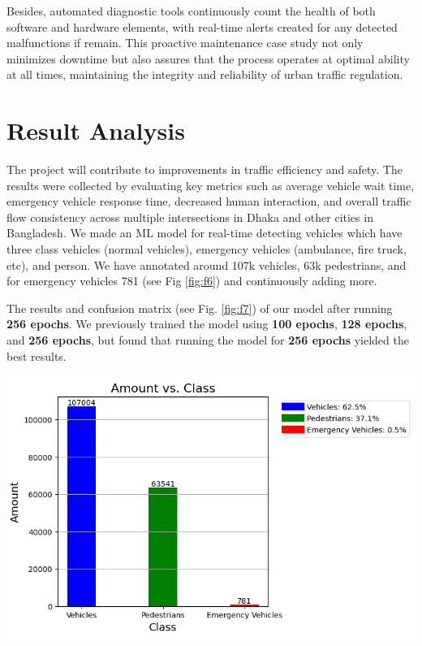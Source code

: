 \documentclass[conference]{IEEEtran}
\begin{document}
Besides, automated diagnostic tools continuously count the health of both software and hardware elements, with real-time alerts created for any detected malfunctions if remain. This proactive maintenance case study not only minimizes downtime but also assures that the process operates at optimal ability at all times, maintaining the integrity and reliability of urban traffic regulation. 


\section{Result Analysis}
The project will contribute to improvements in traffic efficiency and safety. The results were collected by evaluating key metrics such as average vehicle wait time, emergency vehicle response time, decreased human interaction, and overall traffic flow consistency across multiple intersections in Dhaka and other cities in Bangladesh. We made an ML model for real-time detecting vehicles which have three class vehicles (normal vehicles), emergency vehicles (ambulance, fire truck, etc), and person. We have annotated around 107k vehicles, 63k pedestrians, and for emergency vehicles 781 (see Fig \ref{fig:f6}) and continuously adding more.

The results and confusion matrix (see Fig. \ref{fig:f7}) of our model after running \textbf{256 epochs}. We previously trained the model using \textbf{100 epochs}, \textbf{128 epochs}, and \textbf{256 epochs}, but found that running the model for \textbf{256 epochs} yielded the best results. 

\begin{minipage}{0.5\textwidth}
    \centering
    \includegraphics[width=\textwidth]{11.png} %
    \label{fig:f6}
\end{minipage}%
\vspace{0.5cm}
\end{document}

